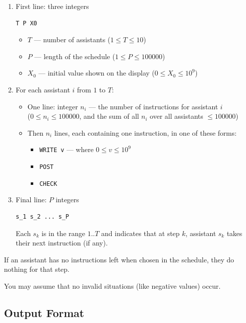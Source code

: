 \begin{enumerate}[label=\arabic*., leftmargin=*]
    \item First line: three integers
\begin{verbatim}
T P X0
\end{verbatim}
    \begin{itemize}
        \item \(T\) --- number of assistants (\(1 \le T \le 10\))
        \item \(P\) --- length of the schedule (\(1 \le P \le 100000\))
        \item \(X_0\) --- initial value shown on the display (\(0 \le X_0 \le
        10^9\))
    \end{itemize}

    \item For each assistant \(i\) from \(1\) to \(T\):
    \begin{itemize}
        \item One line: integer \(n_i\) --- the number of instructions for
        assistant \(i\)\\
        (\(0 \le n_i \le 100000\), and the sum of all \(n_i\) over all
        assistants \(\le 100000\))
        \item Then \(n_i\) lines, each containing one instruction, in one of
        these forms:
        \begin{itemize}
            \item \texttt{WRITE v} --- where \(0 \le v \le 10^9\)
            \item \texttt{POST}
            \item \texttt{CHECK}
        \end{itemize}
    \end{itemize}

    \item Final line: \(P\) integers
\begin{verbatim}
s_1 s_2 ... s_P
\end{verbatim}
    Each \(s_k\) is in the range \(1..T\) and indicates that at step \(k\),
    assistant \(s_k\) takes their next instruction (if any).
\end{enumerate}

If an assistant has no instructions left when chosen in the schedule, they do
nothing for that step.

You may assume that no invalid situations (like negative values) occur.

\subsection*{Output Format}

